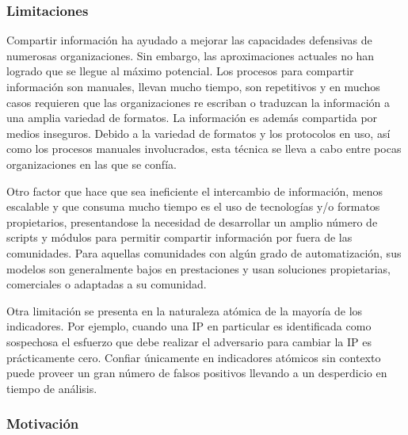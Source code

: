 \subsubsection{Limitaciones}

Compartir información ha ayudado a mejorar las capacidades defensivas de 
numerosas organizaciones. Sin embargo, las aproximaciones actuales no han 
logrado que se llegue al máximo potencial. Los procesos para compartir 
información son manuales, llevan mucho tiempo, son repetitivos y en muchos casos 
requieren que  las organizaciones re escriban o traduzcan la información a una 
amplia variedad de formatos. La información es además compartida por medios 
inseguros. Debido a la variedad de formatos y los protocolos en uso, así como 
los procesos manuales involucrados, esta técnica se lleva a cabo entre pocas 
organizaciones en las que se confía.


Otro factor que hace que sea ineficiente el intercambio de información, menos escalable y que consuma mucho tiempo es el uso de tecnologías 
y/o formatos propietarios, presentandose la necesidad de desarrollar un amplio 
número de scripts y módulos para permitir compartir información por fuera de las 
comunidades. Para aquellas comunidades con algún grado de automatización, sus 
modelos son generalmente bajos en prestaciones y usan soluciones propietarias,
comerciales o adaptadas a su comunidad.

Otra limitación se presenta en la naturaleza atómica de la mayoría de los 
indicadores. Por ejemplo, cuando una IP en particular es identificada como 
sospechosa el esfuerzo que debe realizar el adversario para cambiar la IP es 
prácticamente cero. Confiar únicamente en indicadores atómicos sin contexto 
puede proveer un gran número de falsos positivos llevando a un desperdicio en 
tiempo de análisis.

\subsubsection{Motivación}

